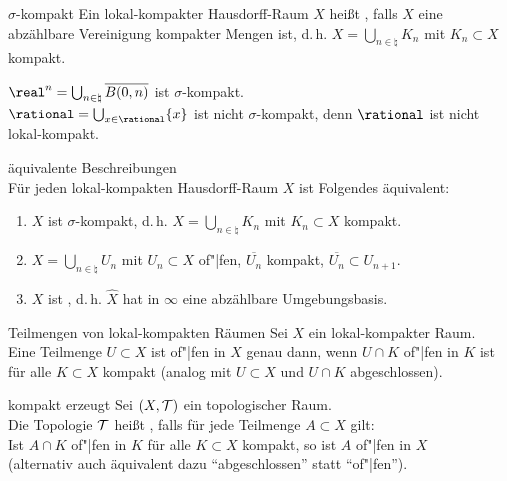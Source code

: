 \linie

\begin{Def}{$\sigma$-kompakt}
    Ein lokal-kompakter Hausdorff-Raum $X$ heißt ,
    falls $X$ eine abzählbare Vereinigung kompakter Mengen ist, d.\,h.
    $X = \bigcup_{n \in \natural} K_n$ mit $K_n \subset X$ kompakt.
\end{Def}

\begin{Bsp}
    $\real^n = \bigcup_{n \in \natural} \abschluss{B(0, n)}$ ist
    $\sigma$-kompakt. \\
    $\rational = \bigcup_{x \in \rational} \{x\}$ ist nicht $\sigma$-kompakt,
    denn $\rational$ ist nicht lokal-kompakt.
\end{Bsp}

\begin{Satz}{äquivalente Beschreibungen}\\
    Für jeden lokal-kompakten Hausdorff-Raum $X$ ist Folgendes äquivalent:
    \begin{enumerate}
        \item
        $X$ ist $\sigma$-kompakt, d.\,h. $X = \bigcup_{n \in \natural} K_n$ mit
        $K_n \subset X$ kompakt.
        
        \item
        $X = \bigcup_{n \in \natural} U_n$ mit $U_n \subset X$ of"|fen,
        $\overline{U_n}$ kompakt, $\overline{U_n} \subset U_{n+1}$.
        
        \item
        $X$ ist , d.\,h.
        $\widehat{X}$ hat in $\infty$ eine abzählbare Umgebungsbasis.
    \end{enumerate}
\end{Satz}

\linie

\begin{Satz}{Teilmengen von lokal-kompakten Räumen}
    Sei $X$ ein lokal-kompakter Raum. \\
    Eine Teilmenge $U \subset X$ ist of"|fen in $X$ genau dann, wenn
    $U \cap K$ of"|fen in $K$ ist für alle $K \subset X$ kompakt
    (analog mit $U \subset X$ und $U \cap K$ abgeschlossen).
\end{Satz}

\begin{Def}{kompakt erzeugt}
    Sei $(X, \mathcal{T})$ ein topologischer Raum. \\
    Die Topologie $\mathcal{T}$ heißt , falls für jede
    Teilmenge $A \subset X$ gilt: \\
    Ist $A \cap K$ of"|fen in $K$ für alle $K \subset X$ kompakt,
    so ist $A$ of"|fen in $X$ \\
    (alternativ auch äquivalent dazu "`abgeschlossen"' statt "`of"|fen"').
\end{Def}

